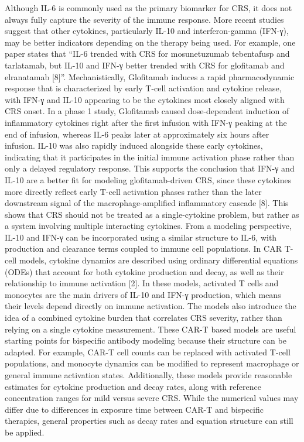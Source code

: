 \documentclass[11pt]{article}
\begin{document}
Although IL-6 is commonly used as the primary biomarker for CRS, it does not always fully capture the severity of the immune response. More recent studies suggest that other cytokines, particularly IL-10 and interferon-gamma (IFN-γ), may be better indicators depending on the therapy being used. For example, one paper states that “IL-6 trended with CRS for mosunetuzumab tebentafusp and tarlatamab, but IL-10 and IFN-γ better trended with CRS for glofitamab and elranatamab [8]”. Mechanistically, Glofitamab induces a rapid pharmacodynamic response that is characterized by early T-cell activation and cytokine release, with IFN-γ and IL-10 appearing to be the cytokines most closely aligned with CRS onset. In a phase 1 study, Glofitamab caused dose-dependent induction of inflammatory cytokines right after the first infusion with IFN-γ peaking at the end of infusion, whereas IL-6 peaks later at approximately six hours after infusion. IL-10 was also rapidly induced alongside these early cytokines, indicating that it participates in the initial immune activation phase rather than only a delayed regulatory response. This supports the conclusion that IFN-γ and IL-10 are a better fit for modeling glofitamab-driven CRS, since these cytokines more directly reflect early T-cell activation phases rather than the later downstream signal of the macrophage-amplified inflammatory cascade [8]. This shows that CRS should not be treated as a single-cytokine problem, but rather as a system involving multiple interacting cytokines. \newline{}\newline{}From a modeling perspective, IL-10 and IFN-γ can be incorporated using a similar structure to IL-6, with production and clearance terms coupled to immune cell populations. In CAR T-cell models, cytokine dynamics are described using ordinary differential equations (ODEs) that account for both cytokine production and decay, as well as their relationship to immune activation [2]. In these models, activated T cells and monocytes are the main drivers of IL-10 and IFN-γ production, which means their levels depend directly on immune activation. The models also introduce the idea of a combined cytokine burden that correlates CRS severity, rather than relying on a single cytokine measurement. \newline{}\newline{}These CAR-T based models are useful starting points for bispecific antibody modeling because their structure can be adapted. For example, CAR-T cell counts can be replaced with activated T-cell populations, and monocyte dynamics can be modified to represent macrophage or general immune activation states. Additionally, these models provide reasonable estimates for cytokine production and decay rates, along with reference concentration ranges for mild versus severe CRS. While the numerical values may differ due to differences in exposure time between CAR-T and bispecific therapies, general properties such as decay rates and equation structure can still be applied.
\par\medskip
\end{document}
